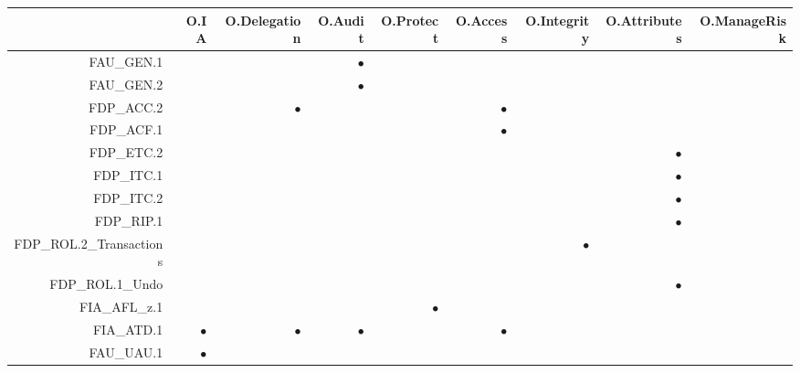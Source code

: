 \documentclass[12pt,english]{scrbook}
\newcommand{\oh}{$\bullet$}
\begin{document}
\begin{table}
    \scriptsize
    \begin{tabular}{rRRRRRRRR}
        \toprule
                            & O.IA & O.Delegation & O.Audit & O.Protect & O.Access & O.Integrity & O.Attributes & O.ManageRisk \\
        \midrule

FAU\_GEN.1                  &      &              & \oh     &           &          &             &              &              \\
FAU\_GEN.2                  &      &              & \oh     &           &          &             &              &              \\
FDP\_ACC.2                  &      & \oh          &         &           & \oh      &             &              &              \\
FDP\_ACF.1                  &      &              &         &           &  \oh     &             &              &              \\
FDP\_ETC.2                  &      &              &         &           &          &             &  \oh         &              \\                
FDP\_ITC.1                  &      &              &         &           &          &             &  \oh         &              \\
FDP\_ITC.2                  &      &              &         &           &          &             &  \oh         &              \\
FDP\_RIP.1                  &      &              &         &           &          &             &  \oh         &              \\
FDP\_ROL.2\_Transactions    &      &              &         &           &          &   \oh       &              &              \\
FDP\_ROL.1\_Undo            &      &              &         &           &          &             &  \oh         &              \\
FIA\_AFL\_z.1               &      &              &         &   \oh     &          &             &              &              \\
FIA\_ATD.1                  & \oh  &  \oh         &   \oh   &           & \oh      &             &              &              \\
FAU\_UAU.1                  & \oh  &              &         &           &          &             &              &              \\

\end{tabular}
\end{table}
\end{document}
